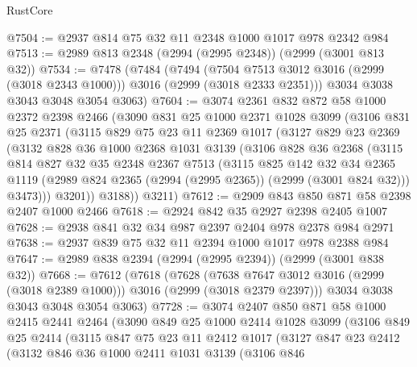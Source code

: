 \begin{lexlean}{RustCore}
\begin{coremodule}
@7504 := @2937 @814 @75 @32 @11 @2348 @1000 @1017 @978 @2342 @984
@7513 := @2989 @813 @2348 (@2994 (@2995 @2348)) (@2999 (@3001 @813 @32))
@7534 := @7478
    (@7484
      (@7494
        (@7504 @7513 @3012 @3016 (@2999 (@3018 @2343 @1000)))
        @3016
        (@2999 (@3018 @2333 @2351)))
      @3034
      @3038
      @3043
      @3048
      @3054
      @3063)
@7604 := @3074
    @2361
    @832
    @872
    @58
    @1000
    @2372
    @2398
    @2466
    (@3090
      @831
      @25
      @1000
      @2371
      @1028
      @3099
      (@3106
        @831
        @25
        @2371
        (@3115
          @829
          @75
          @23
          @11
          @2369
          @1017
          (@3127
            @829
            @23
            @2369
            (@3132
              @828
              @36
              @1000
              @2368
              @1031
              @3139
              (@3106
                @828
                @36
                @2368
                (@3115
                  @814
                  @827
                  @32
                  @35
                  @2348
                  @2367
                  @7513
                  (@3115
                    @825
                    @142
                    @32
                    @34
                    @2365
                    @1119
                    (@2989 @824 @2365 (@2994 (@2995 @2365)) (@2999 (@3001 @824 @32)))
                    @3473)))
              @3201))
          @3188))
      @3211)
@7612 := @2909 @843 @850 @871 @58 @2398 @2407 @1000 @2466
@7618 := @2924 @842 @35 @2927 @2398 @2405 @1007
@7628 := @2938 @841 @32 @34 @987 @2397 @2404 @978 @2378 @984 @2971
@7638 := @2937 @839 @75 @32 @11 @2394 @1000 @1017 @978 @2388 @984
@7647 := @2989 @838 @2394 (@2994 (@2995 @2394)) (@2999 (@3001 @838 @32))
@7668 := @7612
    (@7618
      (@7628
        (@7638 @7647 @3012 @3016 (@2999 (@3018 @2389 @1000)))
        @3016
        (@2999 (@3018 @2379 @2397)))
      @3034
      @3038
      @3043
      @3048
      @3054
      @3063)
@7728 := @3074
    @2407
    @850
    @871
    @58
    @1000
    @2415
    @2441
    @2464
    (@3090
      @849
      @25
      @1000
      @2414
      @1028
      @3099
      (@3106
        @849
        @25
        @2414
        (@3115
          @847
          @75
          @23
          @11
          @2412
          @1017
          (@3127
            @847
            @23
            @2412
            (@3132
              @846
              @36
              @1000
              @2411
              @1031
              @3139
              (@3106
                @846

\end{coremodule}
\end{lexlean}

